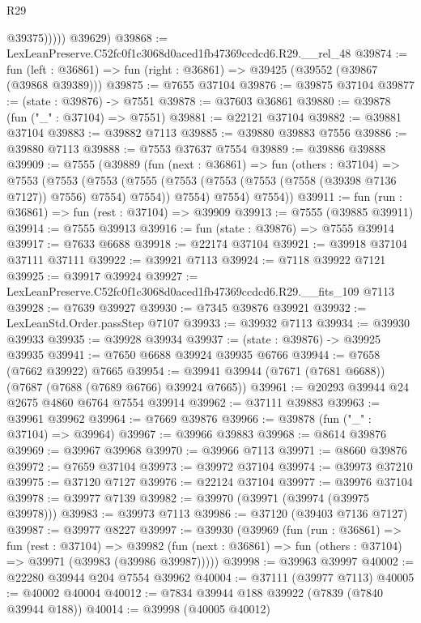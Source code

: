 \begin{lexlean}{R29}
\begin{coremodule}
                @39375)))))
      @39629)
@39868 := LexLeanPreserve.C52fc0f1c3068d0aced1fb47369ccdcd6.R29.__rel_48
@39874 := fun (left : @36861) => fun (right : @36861) => @39425 (@39552 (@39867 (@39868 @39389)))
@39875 := @7655 @37104
@39876 := @39875 @37104
@39877 := (state : @39876) -> @7551
@39878 := @37603 @36861
@39880 := @39878 (fun ("_" : @37104) => @7551)
@39881 := @22121 @37104
@39882 := @39881 @37104
@39883 := @39882 @7113
@39885 := @39880 @39883 @7556
@39886 := @39880 @7113
@39888 := @7553 @37637 @7554
@39889 := @39886 @39888
@39909 := @7555
    (@39889
      (fun (next : @36861) =>
      fun (others : @37104) =>
      @7553
        (@7553
          (@7553
            (@7555 (@7553 (@7553 (@7553 (@7558 (@39398 @7136 @7127)) @7556) @7554) @7554))
            @7554)
          @7554)
        @7554))
@39911 := fun (run : @36861) => fun (rest : @37104) => @39909
@39913 := @7555 (@39885 @39911)
@39914 := @7555 @39913
@39916 := fun (state : @39876) => @7555 @39914
@39917 := @7633 @6688
@39918 := @22174 @37104
@39921 := @39918 @37104 @37111 @37111
@39922 := @39921 @7113
@39924 := @7118 @39922 @7121
@39925 := @39917 @39924
@39927 := LexLeanPreserve.C52fc0f1c3068d0aced1fb47369ccdcd6.R29.__fits_109 @7113
@39928 := @7639 @39927
@39930 := @7345 @39876 @39921
@39932 := LexLeanStd.Order.passStep @7107
@39933 := @39932 @7113
@39934 := @39930 @39933
@39935 := @39928 @39934
@39937 := (state : @39876) -> @39925 @39935
@39941 := @7650 @6688 @39924 @39935 @6766
@39944 := @7658 (@7662 @39922) @7665
@39954 := @39941 @39944 (@7671 (@7681 @6688)) (@7687 (@7688 (@7689 @6766) @39924 @7665))
@39961 := @20293 @39944 @24 @2675 @4860 @6764 @7554 @39914
@39962 := @37111 @39883
@39963 := @39961 @39962
@39964 := @7669 @39876
@39966 := @39878 (fun ("_" : @37104) => @39964)
@39967 := @39966 @39883
@39968 := @8614 @39876
@39969 := @39967 @39968
@39970 := @39966 @7113
@39971 := @8660 @39876
@39972 := @7659 @37104
@39973 := @39972 @37104
@39974 := @39973 @37210
@39975 := @37120 @7127
@39976 := @22124 @37104
@39977 := @39976 @37104
@39978 := @39977 @7139
@39982 := @39970 (@39971 (@39974 (@39975 @39978)))
@39983 := @39973 @7113
@39986 := @37120 (@39403 @7136 @7127)
@39987 := @39977 @8227
@39997 := @39930
    (@39969
      (fun (run : @36861) =>
      fun (rest : @37104) =>
      @39982 (fun (next : @36861) => fun (others : @37104) => @39971 (@39983 (@39986 @39987)))))
@39998 := @39963 @39997
@40002 := @22280 @39944 @204 @7554 @39962
@40004 := @37111 (@39977 @7113)
@40005 := @40002 @40004
@40012 := @7834 @39944 @188 @39922 (@7839 (@7840 @39944 @188))
@40014 := @39998 (@40005 @40012)

\end{coremodule}
\end{lexlean}
